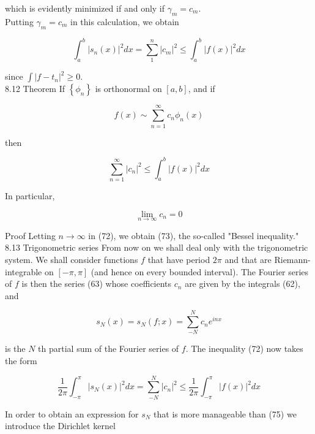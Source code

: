 \documentclass[10pt]{article}
\begin{document}
which is evidently minimized if and only if $\gamma_{m}=c_{m}$.\\
Putting $\gamma_{m}=c_{m}$ in this calculation, we obtain


\begin{equation*}
\int_{a}^{b}\left|s_{n}(x)\right|^{2} d x=\sum_{1}^{n}\left|c_{m}\right|^{2} \leq \int_{a}^{b}|f(x)|^{2} d x \tag{72}
\end{equation*}


since $\int\left|f-t_{n}\right|^{2} \geq 0$.\\
8.12 Theorem If $\left\{\phi_{n}\right\}$ is orthonormal on $[a, b]$, and if

$$
f(x) \sim \sum_{n=1}^{\infty} c_{n} \phi_{n}(x)
$$

then


\begin{equation*}
\sum_{n=1}^{\infty}\left|c_{n}\right|^{2} \leq \int_{a}^{b}|f(x)|^{2} d x \tag{73}
\end{equation*}


In particular,


\begin{equation*}
\lim _{n \rightarrow \infty} c_{n}=0 \tag{74}
\end{equation*}


Proof Letting $n \rightarrow \infty$ in (72), we obtain (73), the so-called "Bessel inequality."\\
8.13 Trigonometric series From now on we shall deal only with the trigonometric system. We shall consider functions $f$ that have period $2 \pi$ and that are Riemann-integrable on $[-\pi, \pi]$ (and hence on every bounded interval). The Fourier series of $f$ is then the series (63) whose coefficients $c_{n}$ are given by the integrals (62), and


\begin{equation*}
s_{N}(x)=s_{N}(f ; x)=\sum_{-N}^{N} c_{n} e^{i n x} \tag{75}
\end{equation*}


is the $N$ th partial sum of the Fourier series of $f$. The inequality (72) now takes the form


\begin{equation*}
\frac{1}{2 \pi} \int_{-\pi}^{\pi}\left|s_{N}(x)\right|^{2} d x=\sum_{-N}^{N}\left|c_{n}\right|^{2} \leq \frac{1}{2 \pi} \int_{-\pi}^{\pi}|f(x)|^{2} d x \tag{76}
\end{equation*}


In order to obtain an expression for $s_{N}$ that is more manageable than (75) we introduce the Dirichlet kernel
\end{document}
